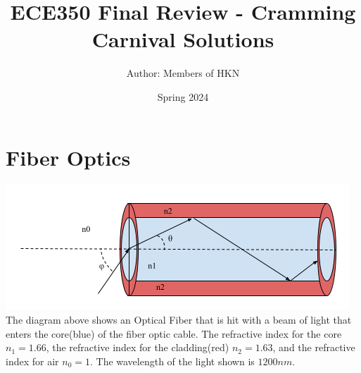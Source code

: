 \documentclass{article}
\title{ECE350 Final Review - Cramming Carnival Solutions}
\author{Author: Members of HKN}
\date{Spring 2024}
\begin{document}
\maketitle

\section{Fiber Optics}
\includegraphics{figures/Optical Fiber Diagram.png}
The diagram above shows an Optical Fiber that is hit with a beam of light that enters the core(blue) of the fiber optic cable. The refractive index for the core $n_{1}=1.66$, the refractive index for the cladding(red) $n_{2}=1.63$, and the refractive index for air $n_{0}=1$. The wavelength of the light shown is $1200 nm$.
\end{document}
